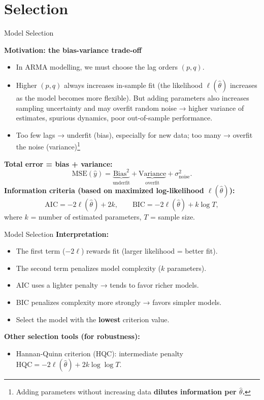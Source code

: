 \documentclass{beamer}
\begin{document}
\section{Selection}

\begin{frame}{Model Selection}
\small

\textbf{Motivation: the bias-variance trade-off}
\begin{itemize}
    \item In ARMA modelling, we must choose the lag orders $(p,q)$.
    \item Higher $(p,q)$ always increases in-sample fit (the likelihood $\ell(\hat\theta)$ increases as the model becomes more flexible). But adding parameters also increases sampling uncertainty and may overfit random noise → higher variance of estimates, spurious dynamics, poor out-of-sample performance.
    \item Too few lags → underfit (bias), especially for new data; too many → overfit the noise (variance)\footnote{\footnotesize Adding parameters without increasing data \textbf{dilutes information per $\hat{\theta}$.}}
\end{itemize}
\textbf{Total error = bias + variance:}
\[
\text{MSE}(\hat{y}) 
= \underbrace{\text{Bias}^2}_{\text{underfit}} 
+ \underbrace{\text{Variance}}_{\text{overfit}} 
+ \sigma^2_\text{noise}.
\]
\textbf{Information criteria (based on maximized log-likelihood $\ell(\hat\theta)$):}
\[
\text{AIC} = -2\ell(\hat\theta) + 2k,
\qquad
\text{BIC} = -2\ell(\hat\theta) + k \log T,
\]
where $k$ = number of estimated parameters, $T$ = sample size.
\end{frame}

\begin{frame}{Model Selection}
\small
\textbf{Interpretation:}
\begin{itemize}
    \item The first term ($-2\ell$) rewards fit (larger likelihood = better fit).
    \item The second term penalizes model complexity ($k$ parameters).
    \item AIC uses a lighter penalty → tends to favor richer models.  
    \item BIC penalizes complexity more strongly → favors simpler models.
    \item Select the model with the \textbf{lowest} criterion value.
\end{itemize}

\textbf{Other selection tools (for robustness):}
\begin{itemize}
    \item Hannan-Quinn criterion (HQC): intermediate penalty  
          $\text{HQC} = -2\ell(\hat\theta) + 2k \log\!\log T$.
\end{itemize}


\end{frame}
\end{document}
